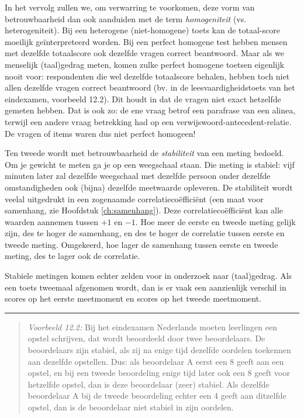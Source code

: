 \documentclass[
]{book}
\begin{document}
In het vervolg zullen we, om verwarring te voorkomen, deze vorm van
betrouwbaarheid dan ook aanduiden met de term \emph{homogeniteit} (vs.
heterogeniteit). Bij een heterogene (niet-homogene) toets kan de
totaal-score moeilijk geïnterpreteerd worden. Bij een perfect homogene
test hebben mensen met dezelfde totaalscore ook dezelfde vragen correct
beantwoord. Maar als we menselijk (taal)gedrag meten, komen zulke
perfect homogene toetsen eigenlijk nooit voor: respondenten die wel
dezelfde totaalscore behalen, hebben toch niet allen dezelfde vragen
correct beantwoord (bv. in de leesvaardigheidstoets van het eindexamen,
voorbeeld 12.2). Dit houdt in dat de
vragen niet exact hetzelfde gemeten hebben. Dat is ook zo: de ene vraag
betrof een parafrase van een alinea, terwijl een andere vraag betrekking
had op een verwijswoord-antecedent-relatie. De vragen of items waren dus
niet perfect homogeen!

Ten tweede wordt met betrouwbaarheid de \emph{stabiliteit} van een meting
bedoeld. Om je gewicht te meten ga je op een weegschaal staan. Die
meting is stabiel: vijf minuten later zal dezelfde weegschaal met
dezelfde persoon onder dezelfde omstandigheden ook (bijna) dezelfde meetwaarde
opleveren. De stabiliteit wordt veelal uitgedrukt in een zogenaamde
correlatiecoëfficiënt (een maat voor samenhang, zie Hoofdstuk
\ref{ch:samenhang}). Deze correlatiecoëfficiënt kan alle waarden
aannemen tussen \(+1\) en \(-1\). Hoe meer de eerste en tweede meting gelijk
zijn, des te hoger de samenhang, en des te hoger de correlatie tussen
eerste en tweede meting. Omgekeerd, hoe lager de samenhang tussen eerste
en tweede meting, des te lager ook de correlatie.

Stabiele metingen komen echter zelden voor in onderzoek naar
(taal)gedrag. Als een toets tweemaal afgenomen wordt, dan is er vaak een
aanzienlijk verschil in scores op het eerste meetmoment en scores op het
tweede meetmoment.

\begin{center}\rule{0.5\linewidth}{0.5pt}\end{center}

\begin{quote}
\emph{Voorbeeld 12.2:}
Bij het eindexamen Nederlands moeten leerlingen een opstel schrijven,
dat wordt beoordeeld door twee beoordelaars. De beoordelaars zijn
stabiel, als zij na enige tijd dezelfde oordelen toekennen aan dezelfde
opstellen. Dus: als beoordelaar A eerst een 8 geeft aan een opstel, en
bij een tweede beoordeling enige tijd later ook een 8 geeft voor
hetzelfde opstel, dan is deze beoordelaar (zeer) stabiel. Als dezelfde
beoordelaar A bij de tweede beoordeling echter een 4 geeft aan ditzelfde
opstel, dan is de beoordelaar niet stabiel in zijn oordelen.
\end{quote}
\end{document}
